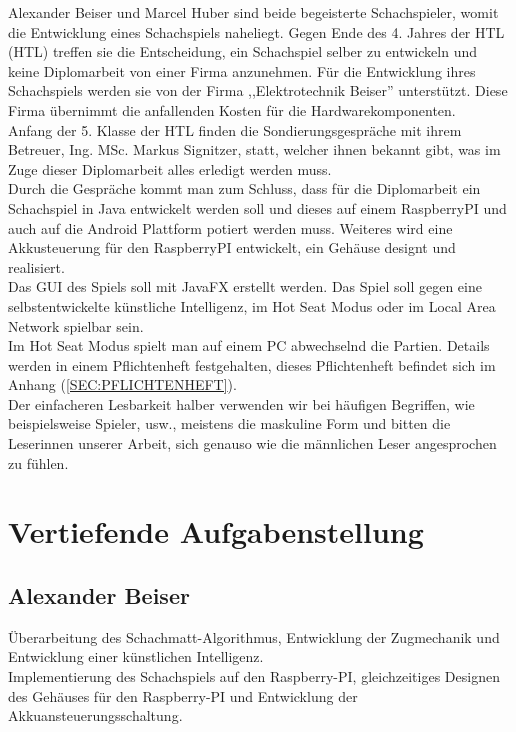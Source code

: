 \documentclass[12pt,a4paper]{article}
\begin{document}
	Alexander Beiser und Marcel Huber sind beide begeisterte Schachspieler, womit die Entwicklung eines Schachspiels naheliegt. Gegen Ende des 4. Jahres der HTL (\acl{HTL}) treffen sie die Entscheidung, ein Schachspiel selber zu entwickeln und keine Diplomarbeit von einer Firma anzunehmen. Für die Entwicklung ihres Schachspiels werden sie von der Firma ,,Elektrotechnik Beiser'' unterstützt. Diese Firma übernimmt die anfallenden Kosten für die Hardwarekomponenten.\\
	Anfang der 5. Klasse der HTL finden die Sondierungsgespräche mit ihrem Betreuer, Ing. MSc. Markus Signitzer, statt, welcher ihnen bekannt gibt, was im Zuge dieser Diplomarbeit alles erledigt werden muss. \\
Durch die Gespräche kommt man zum Schluss, dass für die Diplomarbeit ein Schachspiel in Java entwickelt werden soll und dieses auf einem RaspberryPI und auch auf die Android Plattform potiert werden muss. Weiteres wird eine Akkusteuerung für den RaspberryPI entwickelt, ein Gehäuse designt und realisiert. \\
	Das  \acl{GUI} des Spiels soll mit JavaFX erstellt werden. Das Spiel soll gegen eine selbstentwickelte künstliche Intelligenz, im Hot Seat Modus oder im Local Area Network spielbar sein. \\
	Im Hot Seat Modus spielt man auf einem PC abwechselnd die Partien.
	Details werden in einem Pflichtenheft festgehalten, dieses Pflichtenheft befindet sich im Anhang (\ref{SEC:PFLICHTENHEFT}).\\[1ex]
	Der einfacheren Lesbarkeit halber verwenden wir bei häufigen
Begriffen, wie beispielsweise Spieler, usw., meistens die maskuline Form und bitten die
Leserinnen unserer Arbeit, sich genauso wie die männlichen Leser angesprochen zu fühlen.
	
	\newpage
\section{Vertiefende Aufgabenstellung}
 \subsection{Alexander Beiser}
 	Überarbeitung des Schachmatt-Algorithmus, Entwicklung der Zugmechanik und Entwicklung einer künstlichen Intelligenz. \\
Implementierung des Schachspiels auf den Raspberry-PI, gleichzeitiges Designen des Gehäuses für den Raspberry-PI und Entwicklung der Akkuansteuerungsschaltung. 
	
\end{document}

